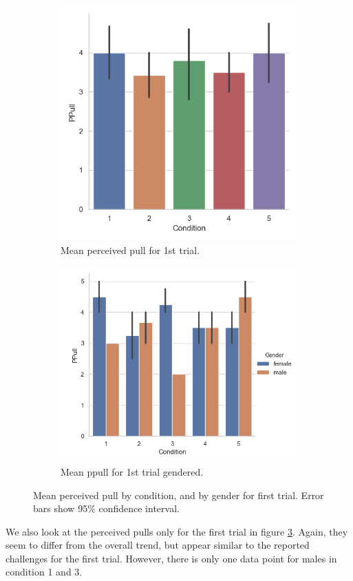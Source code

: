 \begin{figure}[H]
 \begin{subfigure}[b]{0.5\textwidth}
     \centering
     \includegraphics[scale=0.5]{Files/Plots/ppull_first_trial.png}
     \caption{Mean perceived pull for 1st trial.}
     \label{fig:meanPPull1st}
 \end{subfigure}
  \begin{subfigure}[b]{0.5\textwidth}
     \centering
     \includegraphics[scale=0.5]{Files/Plots/ppull_first_trial_gen.png}
     \caption{Mean ppull for 1st trial gendered.}
     \label{fig:meanPPullGen1st}
 \end{subfigure}
     \caption{Mean perceived pull by condition, and by gender for first trial. Error bars show 95\%  confidence interval.}
    \label{fig:PPull1st}
\end{figure}
We also look at the perceived pulls only for the first trial in figure \ref{fig:PPull1st}. Again, they seem to differ from the overall trend, but appear similar to the reported challenges for the first trial. However, there is only one data point for males in condition 1 and 3.

